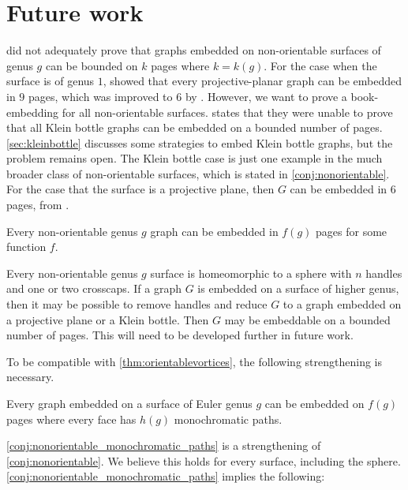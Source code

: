 
\section{Future work}

\textcite{heathPagenumberGenusGraphs1992} did not adequately prove that graphs embedded on non-orientable surfaces of genus $g$ can be bounded on $k$ pages where $k = k(g)$. For the case when the surface is of genus $1$, \textcite{nakamotoBookEmbeddingProjectiveplanar2015} showed that every projective-planar graph can be embedded in $9$ pages, which was improved to 6 by \textcite{ozekiBookEmbeddingGraphs2019}. However, we want to prove a book-embedding for all non-orientable surfaces. 
\textcite{ozekiBookEmbeddingGraphs2019} states that they were unable to prove that all Klein bottle graphs can be embedded on a bounded number of pages. \cref{sec:kleinbottle} discusses some strategies to embed Klein bottle graphs, but the problem remains open. The Klein bottle case is just one example in the much broader class of non-orientable surfaces, which is stated in \cref{conj:nonorientable}. For the case that the surface is a projective plane, then $G$ can be embedded in 6 pages, from \textcite{ozekiBookEmbeddingGraphs2019}. 
\begin{conjecture}\label{conj:nonorientable}
	Every non-orientable genus $g$ graph can be embedded in $f(g)$ pages for some function $f$. 
\end{conjecture}

Every non-orientable genus $g$ surface is homeomorphic to a sphere with $n$ handles and one or two crosscaps. If a graph $G$ is embedded on a surface of higher genus, then it may be possible to remove handles and reduce $G$ to a graph embedded on a projective plane or a Klein bottle. Then $G$ may be embeddable on a bounded number of pages. This will need to be developed further in future work.

To be compatible with \cref{thm:orientablevortices}, the following strengthening is necessary. 
\begin{conjecture}\label{conj:nonorientable_monochromatic_paths}
	Every graph embedded on a surface of Euler genus $g$ can be embedded on $f(g)$ pages where every face has $h(g)$ monochromatic paths. 
\end{conjecture}

\cref{conj:nonorientable_monochromatic_paths} is a strengthening of \cref{conj:nonorientable}. We believe this holds for every surface, including the sphere.
\cref{conj:nonorientable_monochromatic_paths} implies the following:


